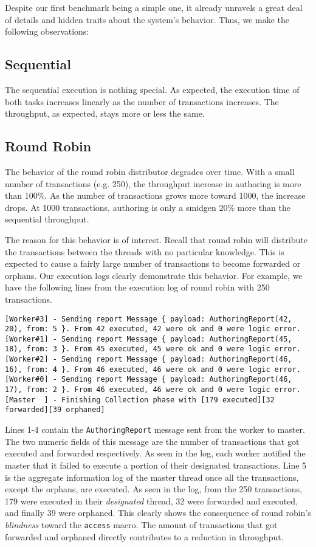 Despite our first benchmark being a simple one, it already unravels a great deal of details and
hidden traits about the system's behavior. Thus, we make the following observations:

\subsection*{Sequential}
The sequential execution is nothing special. As expected, the execution time of both tasks
increases linearly as the number of transactions increases. The throughput, as expected, stays
more or less the same.


\subsection*{Round Robin}
The behavior of the round robin distributor degrades over time. With a small number of transactions
(e.g. 250), the throughput increase in authoring is more than 100\%. As the number of transactions
grows more toward 1000, the increase drops. At 1000 transactions, authoring is only a smidgen 20\%
more than the sequential throughput.

The reason for this behavior is of interest. Recall that round robin will distribute the
transactions between the threads with no particular knowledge. This is expected to cause a fairly
large number of transactions to become forwarded or orphans. Our execution logs clearly demonstrate
this behavior. For example, we have the following lines from the execution log of round robin with
250 transactions.

\begin{lstlisting}
[Worker#3] - Sending report Message { payload: AuthoringReport(42, 20), from: 5 }. From 42 executed, 42 were ok and 0 were logic error.
[Worker#1] - Sending report Message { payload: AuthoringReport(45, 18), from: 3 }. From 45 executed, 45 were ok and 0 were logic error.
[Worker#2] - Sending report Message { payload: AuthoringReport(46, 16), from: 4 }. From 46 executed, 46 were ok and 0 were logic error.
[Worker#0] - Sending report Message { payload: AuthoringReport(46, 17), from: 2 }. From 46 executed, 46 were ok and 0 were logic error.
[Master  ] - Finishing Collection phase with [179 executed][32 forwarded][39 orphaned]
\end{lstlisting}

Lines 1-4 contain the \texttt{AuthoringReport} message sent from the worker to master. The two
numeric fields of this message are the number of transactions that got executed and forwarded
respectively. As seen in the log, each worker notified the master that it failed to execute a
portion of their designated transactions. Line 5 is the aggregate information log of the master
thread once all the transactions, except the orphans, are executed. As seen in the log, from the 250
transactions, 179 were executed in their \textit{designated} thread, 32 were forwarded and executed,
and finally 39 were orphaned. This clearly shows the consequence of round robin's \textit{blindness}
toward the \texttt{access} macro. The amount of transactions that got forwarded and orphaned
directly contributes to a reduction in throughput.


